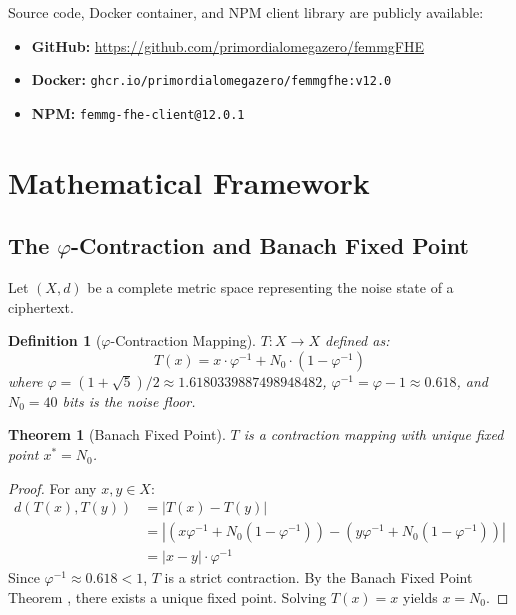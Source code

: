 \documentclass{article}
\newtheorem{theorem}{Theorem}[section]
\newtheorem{definition}{Definition}[section]
\begin{document}
Source code, Docker container, and NPM client library are publicly available:
\begin{itemize}
    \item \textbf{GitHub:} \url{https://github.com/primordialomegazero/femmgFHE}
    \item \textbf{Docker:} \texttt{ghcr.io/primordialomegazero/femmgfhe:v12.0}
    \item \textbf{NPM:} \texttt{femmg-fhe-client@12.0.1}
\end{itemize}

\section{Mathematical Framework}

\subsection{The $\varphi$-Contraction and Banach Fixed Point}

Let $(X, d)$ be a complete metric space representing the noise state of a ciphertext.

\begin{definition}[$\varphi$-Contraction Mapping]
$T: X \to X$ defined as:
\begin{equation}
T(x) = x \cdot \varphi^{-1} + N_0 \cdot (1 - \varphi^{-1})
\end{equation}
where $\varphi = (1+\sqrt{5})/2 \approx 1.6180339887498948482$, $\varphi^{-1} = \varphi - 1 \approx 0.618$, and $N_0 = 40$ bits is the noise floor.
\end{definition}

\begin{theorem}[Banach Fixed Point]
$T$ is a contraction mapping with unique fixed point $x^* = N_0$.
\end{theorem}

\begin{proof}
For any $x, y \in X$:
\begin{align}
d(T(x), T(y)) &= |T(x) - T(y)| \nonumber\\
&= |(x\varphi^{-1} + N_0(1-\varphi^{-1})) - (y\varphi^{-1} + N_0(1-\varphi^{-1}))| \nonumber\\
&= |x - y| \cdot \varphi^{-1}
\end{align}
Since $\varphi^{-1} \approx 0.618 < 1$, $T$ is a strict contraction. By the Banach Fixed Point Theorem \cite{banach1922}, there exists a unique fixed point. Solving $T(x) = x$ yields $x = N_0$.
\end{proof}
\end{document}
